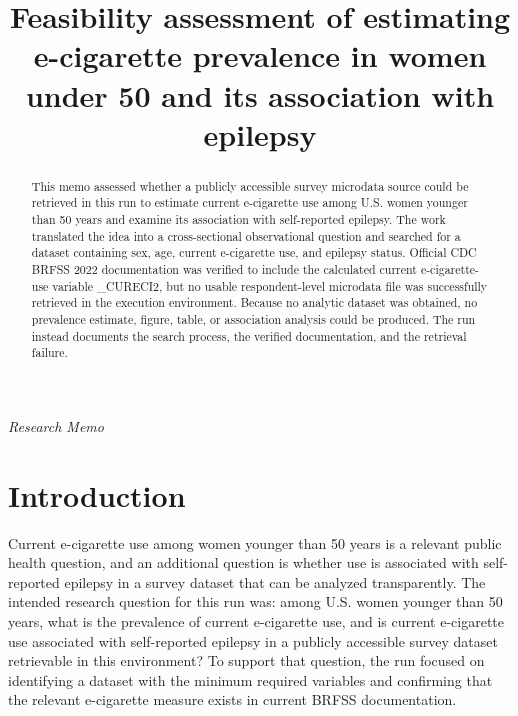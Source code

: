 \documentclass[11pt]{article}
\title{Feasibility assessment of estimating e-cigarette prevalence in women under 50 and its association with epilepsy}
\author{}
\date{}
\begin{document}
\maketitle

\begin{center}\small\textit{Research Memo}\end{center}

\begin{abstract}

This memo assessed whether a publicly accessible survey microdata source could be retrieved in this run to estimate current e-cigarette use among U.S. women younger than 50 years and examine its association with self-reported epilepsy. The work translated the idea into a cross-sectional observational question and searched for a dataset containing sex, age, current e-cigarette use, and epilepsy status. Official CDC BRFSS 2022 documentation was verified to include the calculated current e-cigarette-use variable \_CURECI2, but no usable respondent-level microdata file was successfully retrieved in the execution environment. Because no analytic dataset was obtained, no prevalence estimate, figure, table, or association analysis could be produced. The run instead documents the search process, the verified documentation, and the retrieval failure. \cite{ref1} \cite{ref2} \cite{ref3}

\end{abstract}

\section{Introduction}
Current e-cigarette use among women younger than 50 years is a relevant public health question, and an additional question is whether use is associated with self-reported epilepsy in a survey dataset that can be analyzed transparently. The intended research question for this run was: among U.S. women younger than 50 years, what is the prevalence of current e-cigarette use, and is current e-cigarette use associated with self-reported epilepsy in a publicly accessible survey dataset retrievable in this environment? To support that question, the run focused on identifying a dataset with the minimum required variables and confirming that the relevant e-cigarette measure exists in current BRFSS documentation. \cite{ref1} \cite{ref2}
\end{document}
